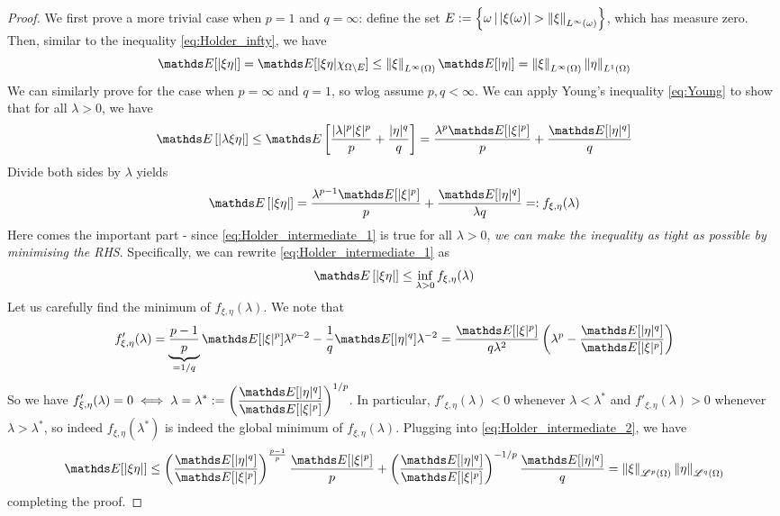 \begin{proof}
We first prove a more trivial case when $p = 1$ and $q = \infty$: define the set $E := \left\{ \omega \,|\, |\xi(\omega)| > \left\| \xi \right\|_{L^\infty(\omega)} \right \}$, which has measure zero. Then, similar to the inequality \eqref{eq:Holder_infty}, we have
\begin{equation}
    \E[|\xi \eta|] = \E[|\xi \eta| \chi_{\Omega \setminus E}] \leq \norm{\xi}_{L^\infty(\Omega)} \E[|\eta|] = \norm{\xi}_{L^\infty(\Omega)} \norm{\eta}_{L^1(\Omega)}
\end{equation}
We can similarly prove for the case when $p = \infty$ and $q = 1$, so wlog assume $p,q < \infty$. We can apply Young's inequality \eqref{eq:Young} to show that for all $\lambda > 0$, we have
\begin{align*}
    \E\sqbracket{|\lambda \xi \eta|} \leq \E\sqbracket{\frac{|\lambda|^p |\xi|^p}{p} + \frac{|\eta|^q}{q}} = \frac{\lambda^p \E[|\xi|^p]}{p} + \frac{\E[|\eta|^q]}{q}
\end{align*}
Divide both sides by $\lambda$ yields
\begin{align} \label{eq:Holder_intermediate_1}
    \E\sqbracket{|\xi \eta|} = \frac{\lambda^{p-1} \E[|\xi|^p]}{p} + \frac{\E[|\eta|^q]}{\lambda q} =: f_{\xi, \eta}(\lambda)
\end{align}
Here comes the important part - since \eqref{eq:Holder_intermediate_1} is true for all $\lambda > 0$, \textit{we can make the inequality as tight as possible by minimising the RHS}. Specifically, we can rewrite \eqref{eq:Holder_intermediate_1} as
\begin{align}
    \E\sqbracket{|\xi \eta|} \leq \inf_{\lambda > 0} f_{\xi, \eta}(\lambda)
\end{align}
Let us carefully find the minimum of $f_{\xi,\eta}(\lambda)$. We note that 
\begin{equation} \label{eq:Holder_intermediate_2}
    f'_{\xi,\eta}(\lambda) = \underbrace{\frac{p-1}{p}}_{=1/q}  \E[|\xi|^p] \lambda^{p-2} - \frac{1}{q} \E[|\eta|^q] \lambda^{-2} = \frac{\E[|\xi|^p]}{q\lambda^2} \bracket{\lambda^p - \frac{\E[|\eta|^q]}{\E[|\xi|^p]}} 
\end{equation}
So we have $\displaystyle{f'_{\xi,\eta}(\lambda) = 0 \iff \lambda = \lambda^* := \bracket{\frac{\E[|\eta|^q]}{\E[|\xi|^p]}}^{1/p}}$. In particular, $f'_{\xi, \eta}(\lambda) < 0$ whenever $\lambda < \lambda^*$ and $f'_{\xi, \eta}(\lambda) > 0$ whenever $\lambda > \lambda^*$, so indeed $f_{\xi,\eta}(\lambda^*)$ is indeed the global minimum of $f_{\xi,\eta}(\lambda)$. Plugging into \eqref{eq:Holder_intermediate_2}, we have
\begin{equation}
    \E[|\xi \eta|] \leq \bracket{\frac{\E[|\eta|^q]}{\E[|\xi|^p]}}^{\frac{p-1}{p}} \frac{\E[|\xi|^p]}{p} + \bracket{\frac{\E[|\eta|^q]}{\E[|\xi|^p]}}^{-1/p} \frac{\E[|\eta|^q]}{q} =  \norm{\xi}_{\L^p(\Omega)} \norm{\eta}_{\L^q(\Omega)}
\end{equation}
completing the proof.
\end{proof}

